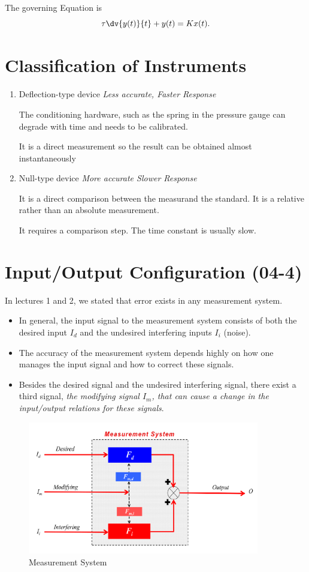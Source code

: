\documentclass[a4paper,UTF8]{article}
\theoremstyle{mystyle}{
  \newtheorem{law}{Law}
}
\begin{document}
 The governing Equation is 
\[
\tau \dv{y(t)}{t} +y(t)=K x(t).
\]

\section{Classification of Instruments}
\begin{enumerate}
\item Deflection-type device
\emph{Less accurate, Faster Response}

The conditioning hardware, such as the spring in the pressure gauge can degrade with time and needs to be calibrated.

It is a direct measurement so the result can be obtained almost instantaneously
\item Null-type device
\emph{More accurate
Slower Response}

It is a direct comparison between the measurand the standard.
It is a relative rather than an absolute measurement.

It requires a comparison step. The time constant is usually slow.
\end{enumerate}



\section{Input/Output Configuration (04-4)}
In lectures 1 and 2, we stated that error exists in any
measurement system.
\begin{itemize}
\item In general, the input signal to the measurement system
consists of both the desired input $I_d$ and the undesired interfering
inputs $I_i$ (noise).
\item The accuracy of the measurement system depends highly on
how one manages the input signal and how to correct these
signals.
\item Besides the desired signal and the undesired interfering signal,
there exist a third signal, \emph{the modifying signal $I_m$, that can cause a
change in the input/output relations for these signals}.
\end{itemize}

\begin{figure}[htbp]
\centering
\caption{Measurement System}
\includegraphics[width=0.9\textwidth]{fig/config}
\end{figure}
\end{document}
